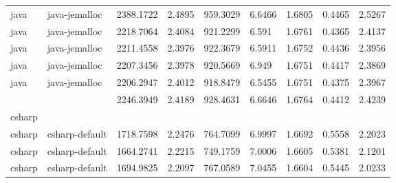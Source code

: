 \begin{longtable}[h]{|lllllllll|}
java           & java-jemalloc          & 2388.1722                 & 2.4895                                                               & 959.3029              & 6.6466           & 1.6805           & 0.4465       & 2.5267        \\
java           & java-jemalloc          & 2218.7064                 & 2.4084                                                               & 921.2299              & 6.591            & 1.6761           & 0.4365       & 2.4137        \\
java           & java-jemalloc          & 2211.4558                 & 2.3976                                                               & 922.3679              & 6.5911           & 1.6752           & 0.4436       & 2.3956        \\
java           & java-jemalloc          & 2207.3456                 & 2.3978                                                               & 920.5669              & 6.949            & 1.6751           & 0.4417       & 2.3869        \\
java           & java-jemalloc          & 2206.2947                 & 2.4012                                                               & 918.8479              & 6.5455           & 1.6751           & 0.4375       & 2.3967        \\
               &                        & 2246.3949                 & 2.4189                                                               & 928.4631              & 6.6646           & 1.6764           & 0.4412       & 2.4239        \\
csharp         &                        &                           &                                                                      &                       &                  &                  &              &               \\
csharp         & csharp-default         & 1718.7598                 & 2.2476                                                               & 764.7099              & 6.9997           & 1.6692           & 0.5558       & 2.2023        \\
csharp         & csharp-default         & 1664.2741                 & 2.2215                                                               & 749.1759              & 7.0006           & 1.6605           & 0.5381       & 2.1201        \\
csharp         & csharp-default         & 1694.9825                 & 2.2097                                                               & 767.0589              & 7.0455           & 1.6604           & 0.5445       & 2.0233        \\

\end{longtable}
